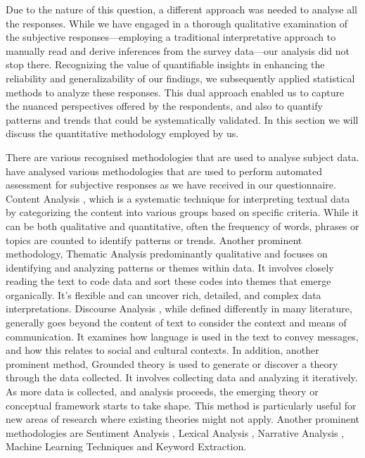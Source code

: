 Due to the nature of this question, a different approach was needed to analyse all the responses. While we have engaged in a thorough qualitative examination of the subjective responses—employing a traditional interpretative approach to manually read and derive inferences from the survey data—our analysis did not stop there. Recognizing the value of quantifiable insights in enhancing the reliability and generalizability of our findings, we subsequently applied statistical methods to analyze these responses. This dual approach enabled us to capture the nuanced perspectives offered by the respondents, and also to quantify patterns and trends that could be systematically validated. In this section we will discuss the quantitative methodology employed by us. 

There are various recognised methodologies that are used to analyse subject data. \textcite{Joshi2024AAnswers} have analysed various methodologies that are used to perform automated assessment for subjective responses as we have received in our questionnaire. Content Analysis \parencite{Harwood2003AnAnalysis}, which is a systematic technique for interpreting textual data by categorizing the content into various groups based on specific criteria. While it can be both qualitative and quantitative, often the frequency of words, phrases or topics are counted to identify patterns or trends. Another prominent methodology, Thematic Analysis \parencite{terry2017thematic} predominantly qualitative and focuses on identifying and analyzing patterns or themes within data. It involves closely reading the text to code data and sort these codes into themes that emerge organically. It's flexible and can uncover rich, detailed, and complex data interpretations. Discourse Analysis \parencite{gill2000discourse}, while defined differently in many literature, generally goes beyond the content of text to consider the context and means of communication. It examines how language is used in the text to convey messages, and how this relates to social and cultural contexts. In addition, another prominent method, Grounded theory \parencite{birks2015grounded_ch1} is used to generate or discover a theory through the data collected. It involves collecting data and analyzing it iteratively. As more data is collected, and analysis proceeds, the emerging theory or conceptual framework starts to take shape. This method is particularly useful for new areas of research where existing theories might not apply. Another prominent methodologies are Sentiment Analysis \parencite{Wankhade2022AChallenges}, Lexical Analysis \parencite{Bolden2000BridgingDivide}, Narrative Analysis \parencite{Burck2005ComparingAnalysis}, Machine Learning Techniques \parencite{Jain2021AReviews, Alantari2022AnReviews} and Keyword Extraction.

